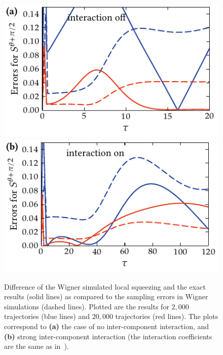 \begin{figure}
    \centerline{%
    \includegraphics{figures_generated/exact/squeezing_nocc_err.pdf}%
    \includegraphics{figures_generated/exact/squeezing_cc_err.pdf}}

    \caption{
    Difference of the Wigner simulated local squeezing and the exact results (solid lines) as compared to the sampling errors in Wigner simulations (dashed lines).
    Plotted are the results for $2,000$ trajectories (blue lines) and $20,000$ trajectories (red lines).
    The plots correspond to \textbf{(a)} the case of no inter-component interaction, and \textbf{(b)} strong inter-component interaction (the interaction coefficients are the same as in~).}%

    \label{fig:wigner-bec:mm:squeezing-error-comparison}
\end{figure}


